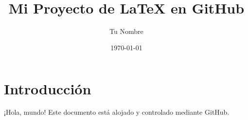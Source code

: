 \documentclass{article}
\title{Mi Proyecto de LaTeX en GitHub}
\author{Tu Nombre}
\date{\today}
\begin{document}
\maketitle

\section{Introducción}
¡Hola, mundo! Este documento está alojado y controlado mediante GitHub.
\end{document}
